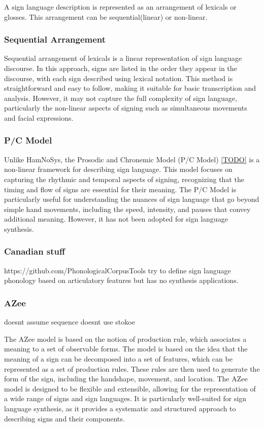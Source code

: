 \documentclass[../../main.tex]{subfiles}
\begin{document}
A sign language description is represented as an arrangement of lexicals or glosses. This arrangement can be sequential(linear) or non-linear.

\subsubsection{Sequential Arrangement}

Sequential arrangement of lexicals is a linear representation of sign language discourse. In this approach, signs are listed in the order they appear in the discourse, with each sign described using lexical notation. This method is straightforward and easy to follow, making it suitable for basic transcription and analysis. However, it may not capture the full complexity of sign language, particularly the non-linear aspects of signing such as simultaneous movements and facial expressions.


\subsubsection{P/C Model}

Unlike HamNoSys, the Prosodic and Chronemic Model (P/C Model) \ref{TODO} is a non-linear framework for describing sign language. This model focuses on capturing the rhythmic and temporal aspects of signing, recognizing that the timing and flow of signs are essential for their meaning. The P/C Model is particularly useful for understanding the nuances of sign language that go beyond simple hand movements, including the speed, intensity, and pauses that convey additional meaning. However, it has not been adopted for sign language synthesis.

\subsubsection{Canadian stuff}

https://github.com/PhonologicalCorpusTools try to define sign language phonology based on articulatory features but has no synthesis applications.

\subsubsection{AZee}

doesnt assume sequence
doesnt use stokoe

The AZee model is based on the notion of production rule, which associates a meaning to a set of observable forms. The model is based on the idea that the meaning of a sign can be decomposed into a set of features, which can be represented as a set of production rules. These rules are then used to generate the form of the sign, including the handshape, movement, and location. The AZee model is designed to be flexible and extensible, allowing for the representation of a wide range of signs and sign languages. It is particularly well-suited for sign language synthesis, as it provides a systematic and structured approach to describing signs and their components.
\end{document}
